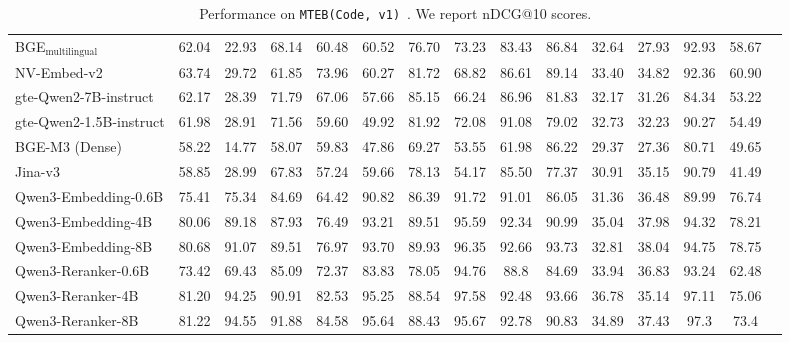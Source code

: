 \begin{table}[h]
{\begin{tabular}{lc|ccccccccccccc}
\\ \midrule
BGE$_\text{multilingual}$  & 62.04 & 22.93 & 68.14 & 60.48 & 60.52 & 76.70 & 73.23 & 83.43 & 86.84 & 32.64 & 27.93 & 92.93 & 58.67 \\
NV-Embed-v2 & 63.74 & 29.72 & 61.85 &73.96 & 60.27 & 81.72 & 68.82 & 86.61 & 89.14 & 33.40 & 34.82 & 92.36 & 60.90 \\
gte-Qwen2-7B-instruct & 62.17 & 28.39 & 71.79 & 67.06 & 57.66 & 85.15 & 66.24 & 86.96 & 81.83 & 32.17 & 31.26 & 84.34 & 53.22  \\
gte-Qwen2-1.5B-instruct & 61.98 & 28.91 & 71.56 & 59.60 & 49.92 & 81.92 & 72.08 & 91.08 & 79.02 & 32.73 & 32.23 & 90.27 & 54.49 \\
\midrule
BGE-M3 (Dense)   & 58.22 &  14.77 & 58.07 & 59.83 & 47.86 & 69.27 & 53.55 & 61.98 & 86.22 & 29.37 & 27.36 & 80.71 & 49.65 \\
Jina-v3 & 58.85 & 28.99 & 67.83 & 57.24 & 59.66 & 78.13 & 54.17 & 85.50 & 77.37 & 30.91 & 35.15 & 90.79 & 41.49 \\
\midrule
Qwen3-Embedding-0.6B & 75.41 & 75.34 & 84.69 & 64.42 & 90.82 & 86.39 & 91.72 & 91.01 & 86.05 & 31.36 & 36.48 & 89.99 & 76.74 \\
Qwen3-Embedding-4B &  80.06 & 89.18 & 87.93 & 76.49 & 93.21 & 89.51 & 95.59 & 92.34 & 90.99 & 35.04 & 37.98 & 94.32 & 78.21 \\
Qwen3-Embedding-8B & 80.68 & 91.07 & 89.51 & 76.97 & 93.70 & 89.93 & 96.35 & 92.66 & 93.73 & 32.81 & 38.04 & 94.75 & 78.75 \\
\midrule
Qwen3-Reranker-0.6B & 73.42 & 69.43 & 85.09 & 72.37 & 83.83 & 78.05 & 94.76 & 88.8 & 84.69 & 33.94 & 36.83 & 93.24 & 62.48 \\
Qwen3-Reranker-4B &  81.20 & 94.25 & 90.91 & 82.53 & 95.25 & 88.54 & 97.58 & 92.48 & 93.66 & 36.78 & 35.14 & 97.11 & 75.06 \\
Qwen3-Reranker-8B & 81.22 & 94.55 & 91.88 & 84.58 & 95.64 & 88.43 & 95.67 & 92.78 & 90.83 & 34.89 & 37.43 & 97.3 & 73.4 \\
\bottomrule
\end{tabular}
}
\caption{
Performance on \texttt{MTEB(Code, v1)}~\citep{enevoldsen2025mmteb}. We report nDCG@10 scores.
}
\label{tab:mteb-code_results}
\end{table}
